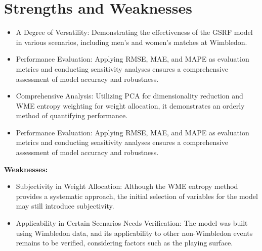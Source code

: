 \documentclass[12pt]{article}%
\begin{document}
	\section{Strengths and Weaknesses}
	\vspace{0.3cm}
	\begin{itemize}
		\item A Degree of Versatility: Demonstrating the effectiveness of the GSRF model in various scenarios, including men's and women's matches at Wimbledon.
		\item Performance Evaluation: Applying RMSE, MAE, and MAPE as evaluation metrics and conducting sensitivity analyses ensures a comprehensive assessment of model accuracy and robustness.
		\item Comprehensive Analysis: Utilizing PCA for dimensionality reduction and WME entropy weighting for weight allocation, it demonstrates an orderly method of quantifying performance.
		\item Performance Evaluation: Applying RMSE, MAE, and MAPE as evaluation metrics and conducting sensitivity analyses ensures a comprehensive assessment of model accuracy and robustness.
	\end{itemize}
	\vspace{0.3cm}
	{\large\textbf{Weaknesses:}}
	\vspace{0.3cm}
	\begin{itemize}
		\item Subjectivity in Weight Allocation: Although the WME entropy method provides a systematic approach, the initial selection of variables for the model may still introduce subjectivity.
		\item Applicability in Certain Scenarios Needs Verification: The model was built using Wimbledon data, and its applicability to other non-Wimbledon events remains to be verified, considering factors such as the playing surface.
	\end{itemize}




	
	
	
	
	\newpage
	
	
\end{document}
